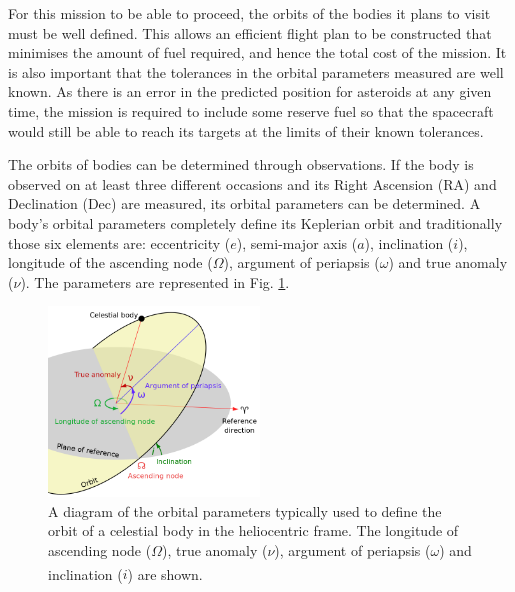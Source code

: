 \documentclass[10pt, twocolumn]{revtex4}    %
\newcommand{\scite}[1]{\textsuperscript{\cite{#1}}}
\begin{document}
For this mission to be able to proceed, the orbits of the bodies it plans to visit must be well defined. This allows an efficient flight plan to be constructed that minimises the amount of fuel required, and hence the total cost of the mission. It is also important that the tolerances in the orbital parameters measured are well known. As there is an error in the predicted position for asteroids at any given time, the mission is required to include some reserve fuel so that the spacecraft would still be able to reach its targets at the limits of their known tolerances.

The orbits of bodies can be determined through observations. If the body is observed on at least three different occasions and its Right Ascension (RA) and Declination (Dec) are measured, its orbital parameters can be determined. A body's orbital parameters completely define its Keplerian orbit and traditionally those six elements are: eccentricity ($e$), semi-major axis ($a$), inclination ($i$), longitude of the ascending node ($\Omega$), argument of periapsis ($\omega$) and true anomaly ($\nu$). The parameters are represented in Fig. \ref{fig: orbital params}.

\begin{figure}[h!]
\centering
\includegraphics[width=0.5\textwidth]{Orbit1.png}
\caption{A diagram of the orbital parameters typically used to define the orbit of a celestial body in the heliocentric frame. The longitude of ascending node ($\Omega$), true anomaly ($\nu$), argument of periapsis ($\omega$) and inclination ($i$) are shown.\scite{FileOrbit1svg}}
\label{fig: orbital params}
\end{figure}
\end{document}
